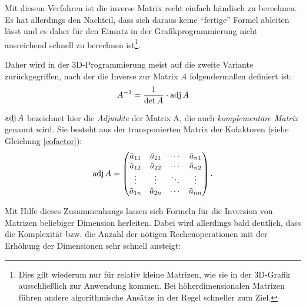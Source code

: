Mit diesem Verfahren ist die inverse Matrix recht einfach händisch zu berechnen. Es hat allerdings den Nachteil, dass sich daraus keine \enquote{fertige} Formel ableiten lässt und es daher für den Einsatz in der Grafikprogrammierung nicht ausreichend schnell zu berechnen ist\footnote{Dies gilt wiederum nur für relativ kleine Matrizen, wie sie in der 3D-Grafik ausschließlich zur Anwendung kommen. Bei höherdimensionalen Matrizen führen andere algorithmische Ansätze in der Regel schneller zum Ziel.}.

Daher wird in der 3D-Programmierung meist auf die zweite Variante zurückgegriffen, nach der die Inverse zur Matrix $A$ folgendermaßen definiert ist:
\begin{equation}
 A^{-1} = \frac{1}{\det A} \cdot \operatorname{adj}A
\end{equation}

$\operatorname{adj}A$ bezeichnet hier die \emph{Adjunkte} der Matrix A, die auch \emph{komplementäre Matrix} genannt wird. Sie besteht aus der transponierten Matrix der Kofaktoren (siehe Gleichung \ref{cofactor}):
\begin{equation}
 \operatorname{adj}A = \begin{pmatrix}
   \tilde a_{11} & \tilde a_{21} & \cdots & \tilde a_{n1}\\
   \tilde a_{12} & \tilde a_{22} & \cdots & \tilde a_{n2}\\
   \vdots & \vdots & \ddots & \vdots\\
   \tilde a_{1n} & \tilde a_{2n} & \cdots & \tilde a_{nn}
 \end{pmatrix}.
\end{equation}

Mit Hilfe dieses Zusammenhangs lassen sich Formeln für die Inversion von Matrizen beliebiger Dimension herleiten. Dabei wird allerdings bald deutlich, dass die Komplexität bzw. die Anzahl der nötigen Rechenoperationen mit der Erhöhung der Dimensionen sehr schnell ansteigt:

